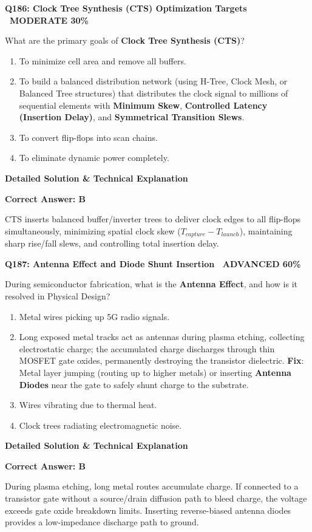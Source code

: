 \documentclass[11pt,a4paper]{article}
\newcommand{\badgeadv}{{\color{white}\colorbox{advred}{\bfseries\sffamily\tiny\ ADVANCED 60\%\ }}}
\newcommand{\badgemod}{{\color{white}\colorbox{modoran}{\bfseries\sffamily\tiny\ MODERATE 30\%\ }}}
\newenvironment{qbox}[2]{%
  \begin{mdframed}[style=qstyle]%
  {\bfseries\sffamily\color{primaryblue}#1 \hfill #2}\par\vspace{2pt}%
}{%
  \end{mdframed}%
}
\newenvironment{ansbox}{%
  \begin{mdframed}[style=ansstyle]%
  {\bfseries\sffamily\color{ansgreen}\small Detailed Solution \& Technical Explanation}\par\vspace{2pt}\small%
}{%
  \end{mdframed}%
}
\begin{document}
\begin{qbox}{Q186: Clock Tree Synthesis (CTS) Optimization Targets}{\badgemod}
What are the primary goals of \textbf{Clock Tree Synthesis (CTS)}?
\begin{enumerate}[label=\textbf{\Alph*.}]
  \item To minimize cell area and remove all buffers.
  \item To build a balanced distribution network (using H-Tree, Clock Mesh, or Balanced Tree structures) that distributes the clock signal to millions of sequential elements with \textbf{Minimum Skew}, \textbf{Controlled Latency (Insertion Delay)}, and \textbf{Symmetrical Transition Slews}.
  \item To convert flip-flops into scan chains.
  \item To eliminate dynamic power completely.
\end{enumerate}
\end{qbox}
\begin{ansbox}
\textbf{Correct Answer: B}

CTS inserts balanced buffer/inverter trees to deliver clock edges to all flip-flops simultaneously, minimizing spatial clock skew ($T_{capture} - T_{launch}$), maintaining sharp rise/fall slews, and controlling total insertion delay.
\end{ansbox}

\begin{qbox}{Q187: Antenna Effect and Diode Shunt Insertion}{\badgeadv}
During semiconductor fabrication, what is the \textbf{Antenna Effect}, and how is it resolved in Physical Design?
\begin{enumerate}[label=\textbf{\Alph*.}]
  \item Metal wires picking up 5G radio signals.
  \item Long exposed metal tracks act as antennas during plasma etching, collecting electrostatic charge; the accumulated charge discharges through thin MOSFET gate oxides, permanently destroying the transistor dielectric.  
  \textbf{Fix}: Metal layer jumping (routing up to higher metals) or inserting \textbf{Antenna Diodes} near the gate to safely shunt charge to the substrate.
  \item Wires vibrating due to thermal heat.
  \item Clock trees radiating electromagnetic noise.
\end{enumerate}
\end{qbox}
\begin{ansbox}
\textbf{Correct Answer: B}

During plasma etching, long metal routes accumulate charge. If connected to a transistor gate without a source/drain diffusion path to bleed charge, the voltage exceeds gate oxide breakdown limits. Inserting reverse-biased antenna diodes provides a low-impedance discharge path to ground.
\end{ansbox}
\end{document}
